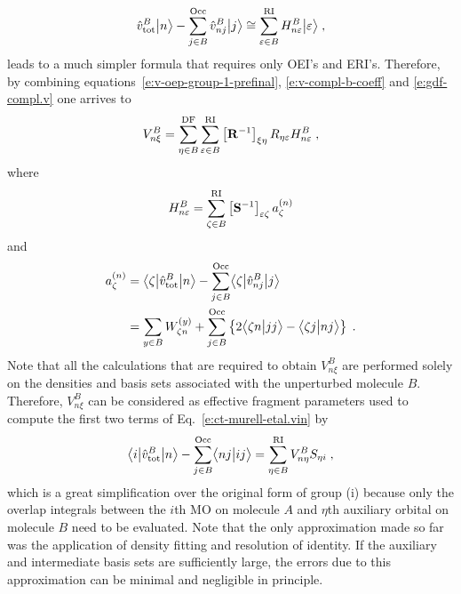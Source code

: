 \documentclass[aip,jcp,amsmath,amssymb,reprint,floatfix]{revtex4-1}
\begin{document}
%
\begin{equation}
 \hat{v}^B_{\rm tot} \Ket{n} - \sum_{j\in B}^{\rm Occ} \hat{v}^B_{nj} \Ket{j}
 \cong \sum_{\varepsilon\in B}^{\rm RI} H_{n\varepsilon}^B \Ket{\varepsilon} \;,
\end{equation}
%
leads to a much simpler formula
that requires only OEI's and ERI's.
Therefore, by combining
equations~\eqref{e:v-oep-group-1-prefinal}, \eqref{e:v-compl-b-coeff} and \eqref{e:gdf-compl.v}
one arrives to
%
\begin{equation} \label{e:v-oep-group-1-final}
 V^B_{n\xi} = \sum_{\eta\in B}^{\rm DF} 
          \sum_{\varepsilon\in B}^{\rm RI}
         \left[ {\bf R}^{-1} \right]_{\xi\eta}
         R_{\eta \varepsilon} 
         H_{n\varepsilon}^B \;,
\end{equation}
%
where
%
\begin{equation} \label{e:v-oep-group-1-final:H-matrix}
 H_{n\varepsilon}^B = \sum_{\zeta\in B}^{\rm RI} \left[ {\bf S}^{-1} \right]_{\varepsilon\zeta}
   a_\zeta^{(n)}
\end{equation}
%
and
\begin{align} \label{e:v-oep-group-1-final:a-vector}
 a^{(n)}_\zeta &= \tBraKet{\zeta}{\hat{v}^B_{\rm tot}}{n}
      - \sum_{j\in B}^{\rm Occ} \tBraKet{\zeta}{\hat{v}^B_{nj}}{j} \nonumber \\
 &= \sum_{y\in B} W^{(y)}_{\zeta n} 
  + \sum_{j\in B}^{\rm Occ} 
  \left\{
   2\BraKet{\zeta n}{jj} - \BraKet{\zeta j}{nj} 
  \right\} \;.
\end{align}
%
Note that all the calculations that are required to obtain $V^B_{n\xi}$ are performed
solely on the densities and basis sets associated with the unperturbed molecule $B$.
Therefore, $V^B_{n\xi}$ can be considered as effective fragment parameters
used to compute the first two terms of Eq.~\eqref{e:ct-murell-etal.vin} by
%
\begin{equation} \label{e:ct.group-i.final}
        \tBraKet{i}{\hat{v}^B_{\rm tot} }{n} 
      - \sum_{j\in B}^{\rm Occ} \BraKet{nj}{ij} 
       = \sum_{\eta\in B}^{\rm RI} V^B_{n\eta} S_{\eta i} \;,
\end{equation}
%
which is a great simplification over the original form of group (i)
because only the overlap integrals between the $i$th MO on molecule $A$
and $\eta$th auxiliary orbital on molecule $B$ need to be evaluated. %
Note that the only approximation made so far was the application of density fitting
and resolution of identity. If the auxiliary and intermediate
basis sets are sufficiently large, the errors
due to this approximation can be minimal and negligible in principle.
\end{document}
